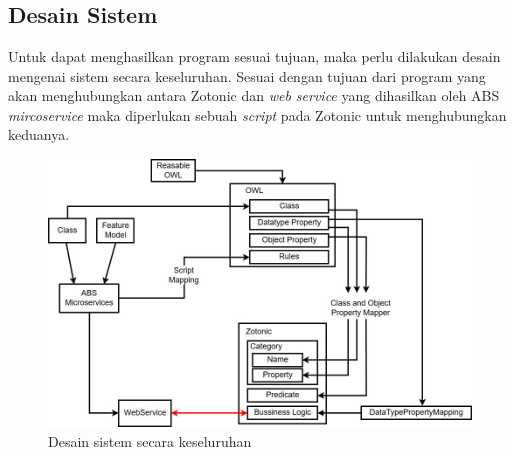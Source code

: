 \chapter{\babTiga}

\section{Desain Sistem}

Untuk dapat menghasilkan program sesuai tujuan, maka perlu dilakukan desain mengenai sistem secara keseluruhan. Sesuai dengan tujuan dari program yang akan menghubungkan antara Zotonic dan \textit{web service} yang dihasilkan oleh ABS \textit{mircoservice} maka diperlukan sebuah \textit{script} pada Zotonic untuk menghubungkan keduanya.

\begin{figure}
	\centering
	\includegraphics[width=1\textwidth]
		{pics/skripsiRoadmap.jpg}
	\caption{Desain sistem secara keseluruhan}
	\label{fig:skripsiroadmap}
\end{figure}
\vspace{-0.8cm}

